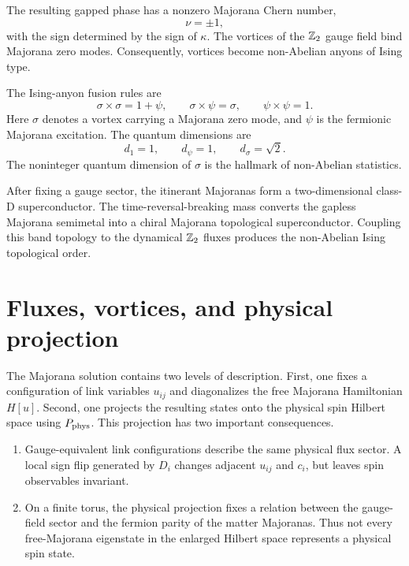The resulting gapped phase has a nonzero Majorana Chern number,
\begin{equation}
\label{eq:kitaev-majorana-chern-number}
    \nu=\pm1,
\end{equation}
with the sign determined by the sign of \(\kappa\).  The vortices of the
\(\mathbb{Z}_2\) gauge field bind Majorana zero modes.  Consequently, vortices become
non-Abelian anyons of Ising type.

The Ising-anyon fusion rules are
\begin{equation}
\label{eq:ising-anyon-fusion-rules}
    \sigma\times\sigma=1+\psi,
    \qquad
    \sigma\times\psi=\sigma,
    \qquad
    \psi\times\psi=1 .
\end{equation}
Here \(\sigma\) denotes a vortex carrying a Majorana zero mode, and \(\psi\) is
the fermionic Majorana excitation.  The quantum dimensions are
\begin{equation}
\label{eq:ising-anyon-quantum-dimensions}
    d_1=1,
    \qquad
    d_\psi=1,
    \qquad
    d_\sigma=\sqrt{2} .
\end{equation}
The noninteger quantum dimension of \(\sigma\) is the hallmark of non-Abelian
statistics.

\begin{remark}
After fixing a gauge sector, the itinerant Majoranas form a two-dimensional
class-D superconductor.  The time-reversal-breaking mass converts the gapless
Majorana semimetal into a chiral Majorana topological superconductor.  Coupling
this band topology to the dynamical \(\mathbb{Z}_2\) fluxes produces the non-Abelian
Ising topological order.
\end{remark}

\section{Fluxes, vortices, and physical projection}
\label{sec:kitaev-fluxes-physical-projection}

The Majorana solution contains two levels of description.  First, one fixes a
configuration of link variables \(u_{ij}\) and diagonalizes the free Majorana
Hamiltonian \(H[u]\).  Second, one projects the resulting states onto the
physical spin Hilbert space using \(P_{\rm phys}\).  This projection has two
important consequences.

\begin{enumerate}[label=(\roman*)]
    \item Gauge-equivalent link configurations describe the same physical flux
    sector.  A local sign flip generated by \(D_i\) changes adjacent \(u_{ij}\)
    and \(c_i\), but leaves spin observables invariant.
    \item On a finite torus, the physical projection fixes a relation between
    the gauge-field sector and the fermion parity of the matter Majoranas.  Thus
    not every free-Majorana eigenstate in the enlarged Hilbert space represents
    a physical spin state.
\end{enumerate}

